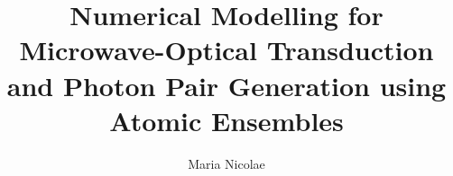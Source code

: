 \title{Numerical Modelling for Microwave-Optical Transduction and Photon Pair Generation using Atomic Ensembles}
\author{Maria Nicolae}
\maketitle
